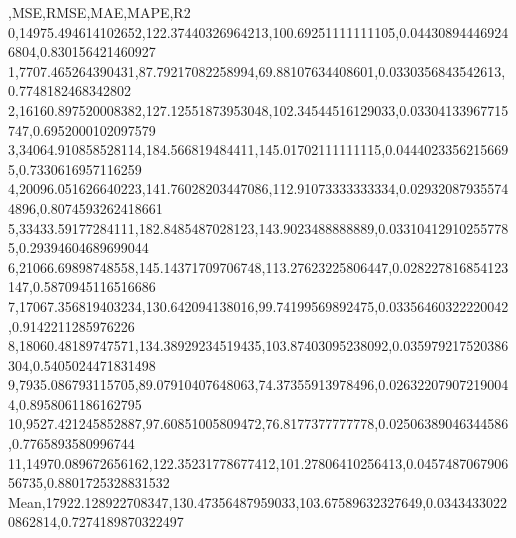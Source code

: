 ,MSE,RMSE,MAE,MAPE,R2
0,14975.494614102652,122.37440326964213,100.69251111111105,0.044308944469246804,0.830156421460927
1,7707.465264390431,87.79217082258994,69.88107634408601,0.0330356843542613,0.7748182468342802
2,16160.897520008382,127.12551873953048,102.34544516129033,0.03304133967715747,0.6952000102097579
3,34064.910858528114,184.566819484411,145.01702111111115,0.04440233562156695,0.7330616957116259
4,20096.051626640223,141.76028203447086,112.91073333333334,0.029320879355744896,0.8074593262418661
5,33433.59177284111,182.8485487028123,143.9023488888889,0.033104129102557785,0.29394604689699044
6,21066.69898748558,145.14371709706748,113.27623225806447,0.028227816854123147,0.5870945116516686
7,17067.356819403234,130.642094138016,99.74199569892475,0.03356460322220042,0.9142211285976226
8,18060.48189747571,134.38929234519435,103.87403095238092,0.035979217520386304,0.5405024471831498
9,7935.086793115705,89.07910407648063,74.37355913978496,0.026322079072190044,0.8958061186162795
10,9527.421245852887,97.60851005809472,76.8177377777778,0.02506389046344586,0.7765893580996744
11,14970.089672656162,122.35231778677412,101.27806410256413,0.045748706790656735,0.8801725328831532
Mean,17922.128922708347,130.47356487959033,103.67589632327649,0.03434330220862814,0.7274189870322497
